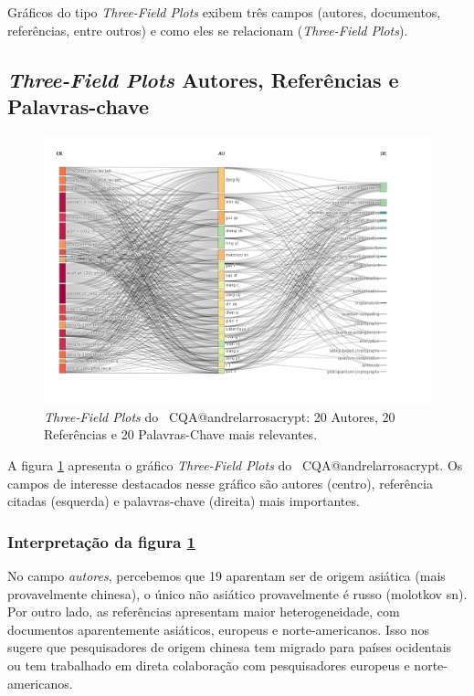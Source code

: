 Gráficos do tipo \textit{Three-Field Plots} exibem três campos (autores, documentos, referências, entre outros) e como eles se relacionam (\textit{Three-Field Plots}).

\subsection{\textit{Three-Field Plots} Autores, Referências e Palavras-chave}

\begin{figure}
    \centering
    \includegraphics[angle=0,width=1\textwidth]{experiments/andrelarrosacrypt/AnaliseBibliometrica/CriptografiaQuantica/imagens/CQA@andrelarrosacrypt_Aut_Ref_Key.png}
    \caption{\textit{Three-Field Plots} do \dataset\ CQA@andrelarrosacrypt: 20 Autores, 20 Referências e 20 Palavras-Chave mais relevantes.}
    \label{CQA@andrelarrosacrypt_Aut_Ref_Key}
\end{figure}

A figura \ref{CQA@andrelarrosacrypt_Aut_Ref_Key} apresenta o gráfico \textit{Three-Field Plots} do  \dataset\ CQA@andrelarrosacrypt. Os campos de interesse destacados nesse gráfico são autores (centro), referência citadas (esquerda) e palavras-chave (direita) mais importantes.


\subsubsection{Interpretação da figura \ref{CQA@andrelarrosacrypt_Aut_Ref_Key}}

No campo \textit{autores}, percebemos que 19 aparentam ser de origem asiática (mais provavelmente chinesa), o único não asiático provavelmente é russo (molotkov sn). Por outro lado, as referências apresentam maior heterogeneidade, com documentos aparentemente asiáticos, europeus e norte-americanos. Isso nos sugere que pesquisadores de origem chinesa tem migrado para países ocidentais ou tem trabalhado em direta colaboração com pesquisadores europeus e norte-americanos.

